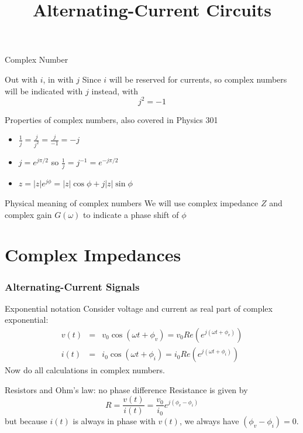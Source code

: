 \documentclass[beamer]{standalone}
\begin{document}
\title[Electronics 1] %
{
	Alternating-Current Circuits
}

\begin{frame} 
  \titlepage
\end{frame}


\begin{frame}{Complex Number}
 \begin{block}{Out with $i$, in with $j$}
  Since $i$ will be reserved for currents, so complex numbers will be indicated with $j$ instead, with
  \begin{equation}
   j^2 = -1
  \end{equation}
 \end{block}
 \begin{block}{Properties of complex numbers, also covered in Physics 301}
  \begin{itemize}
   \item $\frac{1}{j} = \frac{j}{j^2} = \frac{j}{-1} = -j$
   \item $j = e^{j \pi/2}$ so $\frac{1}{j} = j^{-1} = e^{-j \pi/2}$
   \item $z = |z| e^{j \phi} = |z| \cos\phi + j |z| \sin\phi$
  \end{itemize}
 \end{block}
 \begin{block}{Physical meaning of complex numbers}
  We will use complex impedance $Z$ and complex gain $G(\omega)$ to indicate a phase shift of $\phi$
 \end{block}
\end{frame}

\section{Complex Impedances}
\begin{frame}
 \frametitle{Alternating-Current Signals}
 \begin{block}{Exponential notation}
  Consider voltage and current as real part of complex exponential:
  \begin{eqnarray*}
   v(t) & = & v_0 \cos(\omega t + \phi_v) = v_0 Re (e^{j (\omega t + \phi_v)}) \\
   i(t) & = & i_0 \cos(\omega t + \phi_i) = i_0 Re (e^{j (\omega t + \phi_i)})
  \end{eqnarray*}
  Now do all calculations in complex numbers.
 \end{block}
 \begin{block}{Resistors and Ohm's law: no phase difference}
  Resistance is given by
  \begin{equation*}
   R = \frac{v(t)}{i(t)} = \frac{v_0}{i_0} e^{j (\phi_v - \phi_i)}
  \end{equation*}
  but because $i(t)$ is always in phase with $v(t)$, we always have $(\phi_v - \phi_i) = 0$.
 \end{block}
\end{frame}
\end{document}
